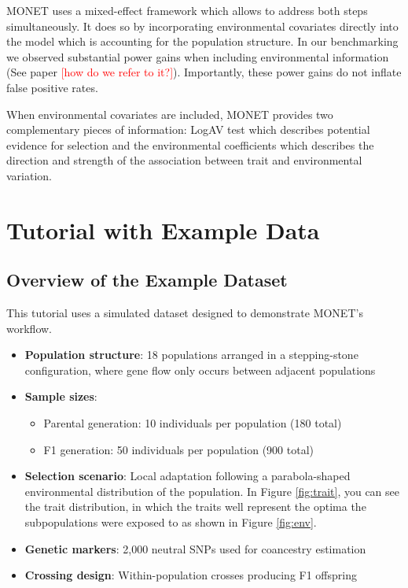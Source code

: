 \documentclass[11pt]{article}
\begin{document}
MONET uses a mixed-effect framework which allows to address both steps simultaneously. It does so by incorporating environmental covariates directly into the model which is accounting for the population structure. In our benchmarking we observed substantial power gains when including environmental information (See paper \textcolor{red}{[how do we refer to it?]}). Importantly, these power gains do not inflate false positive rates. 

When environmental covariates are included, MONET provides two complementary pieces of information: LogAV test which describes potential evidence for selection and the environmental coefficients which describes the direction and strength of the association between trait and environmental variation.

\section{Tutorial with Example Data}

\subsection{Overview of the Example Dataset}

This tutorial uses a simulated dataset designed to demonstrate MONET's workflow.
\begin{itemize}
\item \textbf{Population structure}: 18 populations arranged in a stepping-stone configuration, where gene flow only occurs between adjacent populations
\item \textbf{Sample sizes}: 
  \begin{itemize}
  \item Parental generation: 10 individuals per population (180 total)
  \item F1 generation: 50 individuals per population (900 total)
  \end{itemize}
\item \textbf{Selection scenario}: Local adaptation following a parabola-shaped environmental distribution of the population. In Figure \ref{fig:trait}, you can see the trait distribution, in which the traits well represent the optima the subpopulations were exposed to as shown in Figure \ref{fig:env}.
\item \textbf{Genetic markers}: 2,000 neutral SNPs used for coancestry estimation
\item \textbf{Crossing design}: Within-population crosses producing F1 offspring
\end{itemize}
\end{document}
